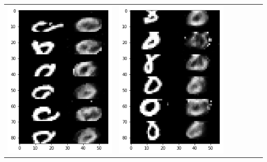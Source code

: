 \documentclass[12pt]{report} %
\begin{document}
\begin{tabular}{m{0.7cm}m{2.4cm}m{2.4cm}m{2.4cm}m{2.4cm}m{2.4cm}m{2.4cm}}
\includegraphics[scale=0.3]{pictures/M1_8_up.png} & \includegraphics[scale=0.3]{pictures/M1_8_down.png} &

\end{tabular}
\end{document}
